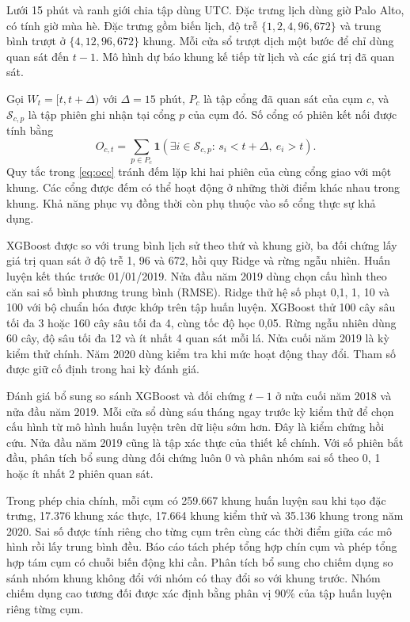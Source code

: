 \documentclass[conference,a4paper]{IEEEtran}
\begin{document}
Lưới 15 phút và ranh giới chia tập dùng UTC. Đặc trưng lịch dùng giờ Palo Alto, có tính giờ mùa hè. Đặc trưng gồm biến lịch, độ trễ $\{1,2,4,96,672\}$ và trung bình trượt ở $\{4,12,96,672\}$ khung. Mỗi cửa sổ trượt dịch một bước để chỉ dùng quan sát đến $t-1$. Mô hình dự báo khung kế tiếp từ lịch và các giá trị đã quan sát.

Gọi $W_t=[t,t+\Delta)$ với $\Delta=15$ phút, $P_c$ là tập cổng đã quan sát của cụm $c$, và $\mathcal S_{c,p}$ là tập phiên ghi nhận tại cổng $p$ của cụm đó. Số cổng có phiên kết nối được tính bằng
\begin{equation}
O_{c,t}=\sum_{p\in P_c}\mathbf{1}\!
\left(\exists i\in\mathcal S_{c,p}:\,
s_i<t+\Delta,\ e_i>t\right).
\label{eq:occ}
\end{equation}
Quy tắc trong \eqref{eq:occ} tránh đếm lặp khi hai phiên của cùng cổng giao với một khung. Các cổng được đếm có thể hoạt động ở những thời điểm khác nhau trong khung. Khả năng phục vụ đồng thời còn phụ thuộc vào số cổng thực sự khả dụng.

XGBoost \cite{chen2016} được so với trung bình lịch sử theo thứ và khung giờ, ba đối chứng lấy giá trị quan sát ở độ trễ 1, 96 và 672, hồi quy Ridge và rừng ngẫu nhiên. Huấn luyện kết thúc trước 01/01/2019. Nửa đầu năm 2019 dùng chọn cấu hình theo căn sai số bình phương trung bình (RMSE). Ridge thử hệ số phạt 0,1, 1, 10 và 100 với bộ chuẩn hóa được khớp trên tập huấn luyện. XGBoost thử 100 cây sâu tối đa 3 hoặc 160 cây sâu tối đa 4, cùng tốc độ học 0,05. Rừng ngẫu nhiên dùng 60 cây, độ sâu tối đa 12 và ít nhất 4 quan sát mỗi lá. Nửa cuối năm 2019 là kỳ kiểm thử chính. Năm 2020 dùng kiểm tra khi mức hoạt động thay đổi. Tham số được giữ cố định trong hai kỳ đánh giá.

Đánh giá bổ sung so sánh XGBoost và đối chứng $t-1$ ở nửa cuối năm 2018 và nửa đầu năm 2019. Mỗi cửa sổ dùng sáu tháng ngay trước kỳ kiểm thử để chọn cấu hình từ mô hình huấn luyện trên dữ liệu sớm hơn. Đây là kiểm chứng hồi cứu. Nửa đầu năm 2019 cũng là tập xác thực của thiết kế chính. Với số phiên bắt đầu, phân tích bổ sung dùng đối chứng luôn 0 và phân nhóm sai số theo 0, 1 hoặc ít nhất 2 phiên quan sát.

Trong phép chia chính, mỗi cụm có 259.667 khung huấn luyện sau khi tạo đặc trưng, 17.376 khung xác thực, 17.664 khung kiểm thử và 35.136 khung trong năm 2020. Sai số được tính riêng cho từng cụm trên cùng các thời điểm giữa các mô hình rồi lấy trung bình đều. Báo cáo tách phép tổng hợp chín cụm và phép tổng hợp tám cụm có chuỗi biến động khi cần. Phân tích bổ sung cho chiếm dụng so sánh nhóm khung không đổi với nhóm có thay đổi so với khung trước. Nhóm chiếm dụng cao tương đối được xác định bằng phân vị 90\% của tập huấn luyện riêng từng cụm.
\end{document}
